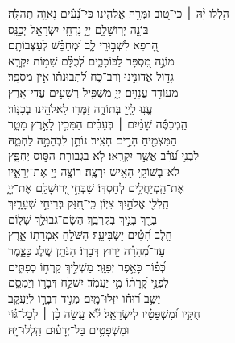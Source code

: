 \documentclass[twoside, openany, parskip=half, 11pt]{book}
\begin{document}
\begin{narrow}
הַ֥לְלוּ יָ֨הּ ׀ \hfill \break
 כִּי־ט֭וֹב זַמְּרָ֣ה אֱלֹהֵ֑ינוּ \hfill כִּי־נָ֝עִ֗ים נָאוָ֥ה תְהִלָּֽה׃ \\
 בּוֹנֵ֣ה יְרֽוּשָׁלַ֣‍ִם יְיָ֑ \hfill נִדְחֵ֖י יִשְׂרָאֵ֣ל יְכַנֵּֽס׃ \\
 הָ֭רֹפֵא לִשְׁב֣וּרֵי לֵ֑ב \hfill וּ֝מְחַבֵּ֗שׁ לְעַצְּבוֹתָֽם׃ \\
 מוֹנֶ֣ה מִ֭סְפָּר לַכּוֹכָבִ֑ים \hfill לְ֝כֻלָּ֗ם שֵׁמ֥וֹת יִקְרָֽא׃ \\
 גָּד֣וֹל אֲדוֹנֵ֣ינוּ וְרַב־כֹּ֑חַ \hfill לִ֝תְבוּנָת֗וֹ אֵ֣ין מִסְפָּֽר׃ \\
 מְעוֹדֵ֣ד עֲנָוִ֣ים יְיָ֑ \hfill מַשְׁפִּ֖יל רְשָׁעִ֣ים עֲדֵי־אָֽרֶץ׃ \\
 עֱנ֣וּ לַֽייָ֣ בְּתוֹדָ֑ה \hfill זַמְּר֖וּ לֵאלֹהֵ֣ינוּ בְכִנּֽוֹר׃ \\
 הַֽמְכַסֶּ֬ה שָׁמַ֨יִם ׀ בְּעָבִ֗ים \hfill הַמֵּכִ֣ין לָאָ֣רֶץ מָטָ֑ר\\ הַמַּצְמִ֖יחַ הָרִ֣ים חָצִֽיר׃ \hfill
 נוֹתֵ֣ן לִבְהֵמָ֣ה לַחְמָ֑הּ\\ לִבְנֵ֥י עֹ֝רֵ֗ב אֲשֶׁ֣ר יִקְרָֽאוּ׃ \hfill
 לֹ֤א בִגְבוּרַ֣ת הַסּ֣וּס יֶחְפָּ֑ץ\\ לֹא־בְשׁוֹקֵ֖י הָאִ֣ישׁ יִרְצֶֽה׃ \hfill
 רוֹצֶ֣ה יְיָ֭ אֶת־יְרֵאָ֑יו\\ אֶת־הַֽמְיַחֲלִ֥ים לְחַסְדּֽוֹ׃ \hfill
 שַׁבְּחִ֣י יְ֭רוּשָׁלַ‍ִם אֶת־יְיָ֑\\ הַֽלְלִ֖י אֱלֹהַ֣יִךְ צִיּֽוֹן׃ \hfill
 כִּֽי־חִ֭זַּק בְּרִיחֵ֣י שְׁעָרָ֑יִךְ\\ בֵּרַ֖ךְ בָּנַ֣יִךְ בְּקִרְבֵּֽךְ׃ \hfill
 הַשָּׂם־גְּבוּלֵ֥ךְ שָׁל֑וֹם\\ חֵ֥לֶב חִ֝טִּ֗ים יַשְׂבִּיעֵֽךְ׃ \hfill
 הַשֹּׁלֵ֣חַ אִמְרָת֣וֹ אָ֑רֶץ\\ עַד־מְ֝הֵרָ֗ה יָר֥וּץ דְּבָרֽוֹ׃ \hfill
 הַנֹּתֵ֣ן שֶׁ֣לֶג כַּצָּ֑מֶר\\ כְּ֝פ֗וֹר כָּאֵ֥פֶר יְפַזֵּֽר׃ \hfill
 מַשְׁלִ֣יךְ קַֽרְח֣וֹ כְפִתִּ֑ים\\ לִפְנֵ֥י קָ֝רָת֗וֹ מִ֣י יַעֲמֹֽד׃ \hfill
 יִשְׁלַ֣ח דְּבָר֣וֹ וְיַמְסֵ֑ם\\ יַשֵּׁ֥ב ר֝וּח֗וֹ יִזְּלוּ־מָֽיִם׃ \hfill
 מַגִּ֣יד דְּבָרָ֣ו לְיַעֲקֹ֑ב\\ חֻקָּ֥יו וּ֝מִשְׁפָּטָ֗יו לְיִשְׂרָאֵֽל׃ \hfill
 לֹ֘א עָ֤שָׂה כֵ֨ן ׀ לְכׇל־גּ֗וֹי\\ וּמִשְׁפָּטִ֥ים בַּל־יְדָע֗וּם \hfill הַֽלְלוּ־יָֽהּ׃ 




\end{narrow}
\end{document}

